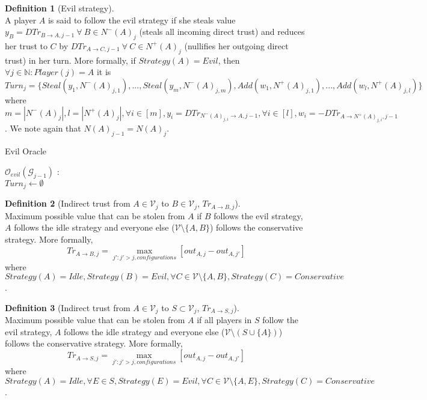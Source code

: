 \documentclass[11pt]{article}
\theoremstyle{definition}
\newtheorem{definition}{Definition}[section]
\theoremstyle{corollary}
\theoremstyle{lemma}
\begin{document}
      \begin{definition}[Evil strategy] \ \\
         A player $A$ is said to follow the evil strategy if she steals value $y_B = DTr_{B \rightarrow A, j-1} \:
         \forall \: B \in N^{-}(A)_j$ (steals all incoming direct trust) and reduces her trust to $C$ by
         $DTr_{A \rightarrow C, j-1} \: \forall \: C \in N^{+}(A)_j$ (nullifies her outgoing direct trust) in her turn.
         More formally, if $Strategy(A) = Evil$, then $\forall j \in \mathbb{N} : Player(j) = A$ it is $Turn_j =
         \{Steal(y_1,N^{-}(A)_{j,1}),...,Steal(y_m,N^{-}(A)_{j,m}), Add(w_1,N^{+}(A)_{j,1}),...,Add(w_l,N^{+}(A)_{j,l})\}$ 
         where $m = |N^{-}(A)_j|, l = |N^{+}(A)_j|, \forall i \in [m], y_i = DTr_{N^{-}(A)_{j,i} \rightarrow A, j-1},
         \forall i \in [l], w_i = -DTr_{A \rightarrow N^{+}(A)_{j,i},j-1}$. We note again that $N(A)_{j-1} = N(A)_j$.
      \end{definition}
      \begin{algorithm}[H]
         \label{eviloracle}
         \caption{Evil Oracle}
         $\mathcal{O}_{evil}(\mathcal{G}_{j-1})$ : \\ {
            $Turn_j \gets \emptyset$ \\
            }
      \end{algorithm}
      \begin{definition}[Indirect trust from $A \in \mathcal{V}_j$ to $B \in \mathcal{V}_j$, $Tr_{A \rightarrow B, j}$] \ \\
         Maximum possible value that can be stolen from $A$ if $B$ follows the evil strategy, $A$ follows the idle strategy
         and everyone else ($\mathcal{V} \setminus \{A,B\}$) follows the conservative strategy. More formally,
         $$Tr_{A \rightarrow B, j} = \max\limits_{j' : j' > j, configurations}{[out_{A,j} - out_{A,j'}]}$$ where
         $Strategy(A) = Idle, Strategy(B) = Evil, \forall C \in \mathcal{V} \setminus \{A,B\}, Strategy(C) = Conservative$.
      \end{definition}
      \begin{definition}[Indirect trust from $A \in \mathcal{V}_j$ to $S \subset \mathcal{V}_j$, $Tr_{A \rightarrow S, j}$]
         \ \\Maximum possible value that can be stolen from $A$ if all players in $S$ follow the evil strategy, $A$ follows
         the idle strategy and everyone else ($\mathcal{V} \setminus (S \cup \{A\})$) follows the conservative strategy. More
         formally, $$Tr_{A \rightarrow S, j} = \max\limits_{j' : j' > j, configurations}{[out_{A,j} - out_{A,j'}]}$$ where
         $Strategy(A) = Idle, \forall E \in S, Strategy(E) = Evil,
         \forall C \in \mathcal{V} \setminus \{A,E\}, Strategy(C) = Conservative$.
      \end{definition}
\end{document}
